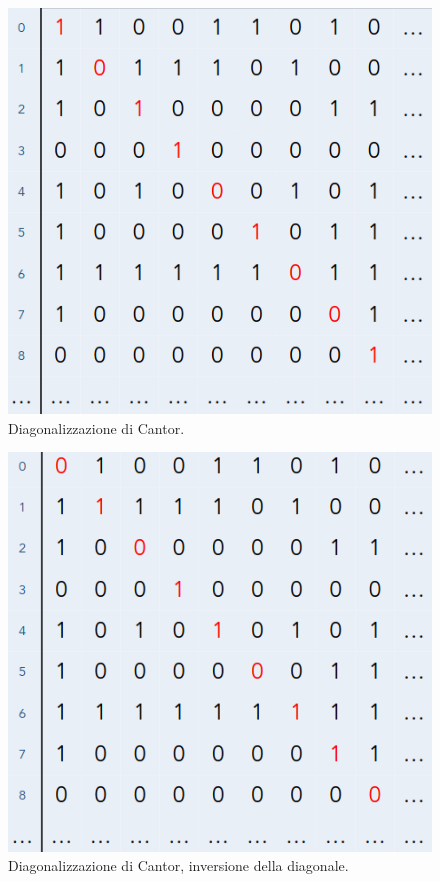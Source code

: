 \begin{figure}[h]
    \centering
    \includegraphics[scale = 0.5]{images/Diagonalizzazione.png}
    \caption{Diagonalizzazione di Cantor.}
\end{figure}

\begin{figure}[h]
    \centering
    \includegraphics[scale = 0.5]{images/Diagonalizzazione 2.png}
    \caption{Diagonalizzazione di Cantor, inversione della diagonale.}
\end{figure}

